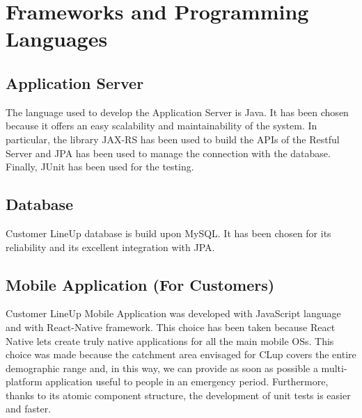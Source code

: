 \section{Frameworks and Programming Languages}

\subsection{Application Server}

The language used to develop the Application Server is Java.  It has been chosen because it offers an easy scalability and maintainability of the system. In particular, the library JAX-RS has been used to build the APIs of the Restful Server  and JPA has been used to manage the connection with the database. Finally, JUnit has been used for the testing.

\subsection{Database}

Customer LineUp database is build upon MySQL. It has been chosen for its reliability and its excellent integration with JPA.

\subsection{Mobile Application (For Customers)}

Customer LineUp Mobile Application was developed with JavaScript language and with React-Native framework. This choice has been taken because React Native lets create truly native applications for all the main mobile OSs. This choice was made because the catchment area envisaged for CLup covers the entire demographic range and, in this way, we can provide as soon as possible a multi-platform application useful to people in an emergency period. Furthermore, thanks to its atomic component structure, the development of unit tests is easier and faster.